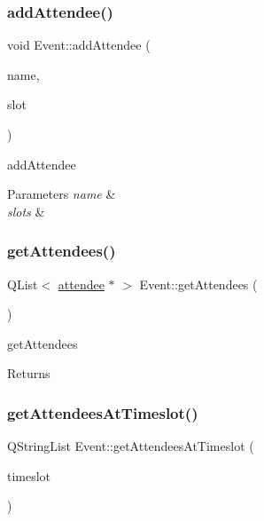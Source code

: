 \subsubsection{\texorpdfstring{add\+Attendee()}{addAttendee()}\hspace{0.1cm}{\footnotesize\ttfamily [3/3]}}
{\footnotesize\ttfamily void Event\+::add\+Attendee (\begin{DoxyParamCaption}\item[{Q\+String}]{name,  }\item[{Q\+List$<$ int $>$}]{slot }\end{DoxyParamCaption})}



add\+Attendee 


\begin{DoxyParams}{Parameters}
{\em name} & \\
\hline
{\em slots} & \\
\hline
\end{DoxyParams}
\mbox{\label{class_event_a56f9898f75ae301df1d10523de57f500}} 
\subsubsection{\texorpdfstring{get\+Attendees()}{getAttendees()}}
{\footnotesize\ttfamily Q\+List$<$ \hyperlink{classattendee}{attendee} $\ast$ $>$ Event\+::get\+Attendees (\begin{DoxyParamCaption}{ }\end{DoxyParamCaption})}



get\+Attendees 

\begin{DoxyReturn}{Returns}

\end{DoxyReturn}
\mbox{\label{class_event_adb10c77700599fb4c6047fd8f4476beb}} 
\subsubsection{\texorpdfstring{get\+Attendees\+At\+Timeslot()}{getAttendeesAtTimeslot()}}
{\footnotesize\ttfamily Q\+String\+List Event\+::get\+Attendees\+At\+Timeslot (\begin{DoxyParamCaption}\item[{int}]{timeslot }\end{DoxyParamCaption})}



